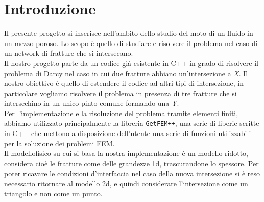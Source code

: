 \chapter*{Introduzione}

Il presente progetto si inserisce nell'ambito dello studio del moto di un fluido in un mezzo poroso. Lo scopo è quello di studiare e risolvere il problema nel caso di un network di fratture che si intersecano. \\
Il nostro progetto parte da un codice già esistente in C++ in grado di risolvere il problema di Darcy nel caso in cui due fratture abbiano un'intersezione a \textit{X}.
Il nostro obiettivo è quello di estendere il codice ad altri tipi di intersezione, in particolare vogliamo risolvere il problema in presenza di tre fratture che si intersechino in un unico pinto comune formando una \textit{Y}.\\
Per l'implementazione e la risoluzione del problema tramite elementi finiti, abbiamo utilizzato principalmente la libreria \texttt{GetFEM++}, una serie di liberie scritte in C++ che mettono a disposizione dell'utente una serie di funzioni utilizzabili per la soluzione dei problemi FEM. \\
Il modellofisico  su cui si basa la nostra implementazione è un modello ridotto, considera cioè le fratture come delle grandezze 1d, trascurandone lo spessore. Per poter ricavare le condizioni d'interfaccia nel caso della nuova intersezione si è reso necessario ritornare al modello 2d, e quindi considerare l'intersezione come un triangolo e non come un punto. 